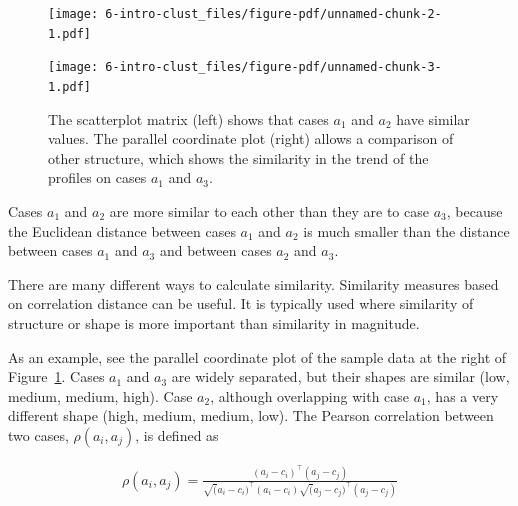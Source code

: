 \documentclass[
  letterpaper,
]{krantz}
\begin{document}
\begin{figure}

\begin{minipage}[t]{0.50\linewidth}

{\centering 

\texttt{[image: 6-intro-clust\_files/figure-pdf/unnamed-chunk-2-1.pdf]}

}

\end{minipage}%
%
\begin{minipage}[t]{0.50\linewidth}

{\centering 

\texttt{[image: 6-intro-clust\_files/figure-pdf/unnamed-chunk-3-1.pdf]}

}

\end{minipage}%

\caption{\label{fig-similarity1}The scatterplot matrix (left) shows that
cases \(a_1\) and \(a_2\) have similar values. The parallel coordinate
plot (right) allows a comparison of other structure, which shows the
similarity in the trend of the profiles on cases \(a_1\) and \(a_3\).}

\end{figure}

\noindent Cases \(a_1\) and \(a_2\) are more similar to each other than
they are to case \(a_3\), because the Euclidean distance between cases
\(a_1\) and \(a_2\) is much smaller than the distance between cases
\(a_1\) and \(a_3\) and between cases \(a_2\) and \(a_3\).

There are many different ways to calculate similarity. Similarity
measures based on correlation distance can be useful. It is typically
used where similarity of structure or shape is more important than
similarity in magnitude.


As an example, see the parallel coordinate plot of the sample data at
the right of Figure~\ref{fig-similarity1}. Cases \(a_1\) and \(a_3\) are
widely separated, but their shapes are similar (low, medium, medium,
high). Case \(a_2\), although overlapping with case \(a_1\), has a very
different shape (high, medium, medium, low). The Pearson correlation
between two cases, \(\rho(a_i,a_j)\), is defined as

\begin{align*}
\rho(a_i,a_j) = \frac{(a_i-c_i)^\top(a_j-c_j)}
{\sqrt(a_i-c_i)^\top(a_i-c_i) \sqrt(a_j-c_j)^\top(a_j-c_j)}
\label{corc}
\end{align*}
\end{document}
